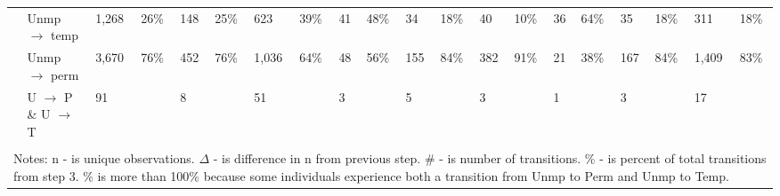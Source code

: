 \begin{tabular}{l>{\raggedright\arraybackslash}p{2in}llllllllllllllllll}
 & Unmp $\rightarrow$ temp & 1,268 & 26\% & 148 & 25\% & 623 & 39\% & 41 & 48\% & 34 & 18\% & 40 & 10\% & 36 & 64\% & 35 & 18\% & 311 & 18\% \\ 
   & Unmp $\rightarrow$ perm & 3,670 & 76\% & 452 & 76\% & 1,036 & 64\% & 48 & 56\% & 155 & 84\% & 382 & 91\% & 21 & 38\% & 167 & 84\% & 1,409 & 83\% \\ 
   & U $\rightarrow$ P \& U $\rightarrow$ T & 91 &  & 8 &  & 51 &  & 3 &  & 5 &  & 3 &  & 1 &  & 3 &  & 17 &  \\ 
   \hline \\[-1.8ex] \multicolumn{20}{p{12in}}{Notes: n - is unique observations.  
               $\Delta$ - is difference in n from previous step.  
               \# - is number of transitions.  
               \% - is percent of total transitions from step 3. 
               \% is more than 100\% because some individuals experience both a transition from Unmp to Perm and Unmp to Temp.} 
\end{tabular}
